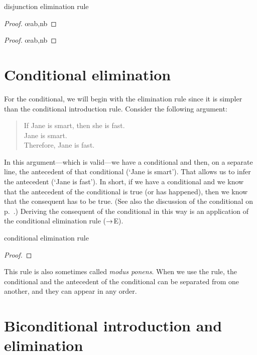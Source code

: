 \begin{factboxy}{disjunction elimination rule}
\begin{proof}
	 \oe{ab,nb}
\end{proof}

\begin{proof}
	 \oe{ab,nb}
\end{proof}
\end{factboxy}

\section{Conditional elimination}

For the conditional, we will begin with the elimination rule since it is simpler than the conditional introduction rule. Consider the following argument:
	\begin{quote}
		If Jane is smart, then she is fast.\\
		Jane is smart.\\ 
		Therefore, Jane is fast.
	\end{quote}
In this argument---which is valid---we have a conditional and then, on a separate line, the antecedent of that conditional (`Jane is smart'). That allows us to infer the antecedent (`Jane is fast'). In short, if we have a conditional and we know that the antecedent of the conditional is true (or has happened), then we know that the consequent has to be true. (See also the discussion of the conditional on p.~\pageref{characteristic-tt-conditional}.) Deriving the consequent of the conditional in this way is an application of the conditional elimination rule ($\rightarrow$E).
\begin{factboxy}{conditional elimination rule}
\begin{proof}
	 
\end{proof}
\end{factboxy}
This rule is also sometimes called \emph{modus ponens}. When we use the rule, the conditional and the antecedent of the conditional can be separated from one another, and they can appear in any order.


\section{Biconditional introduction and elimination} 

